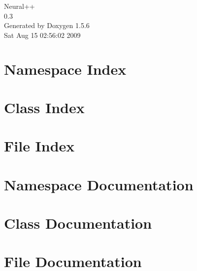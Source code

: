 \documentclass[a4paper]{book}
\begin{document}
\begin{titlepage}
\vspace*{7cm}
\begin{center}
{\Large Neural++ \\[1ex]\large 0.3 }\\
\vspace*{1cm}
{\large Generated by Doxygen 1.5.6}\\
\vspace*{0.5cm}
{\small Sat Aug 15 02:56:02 2009}\\
\end{center}
\end{titlepage}
\clearemptydoublepage
{}
\tableofcontents
\clearemptydoublepage
{}
\chapter{Namespace Index}

\chapter{Class Index}

\chapter{File Index}

\chapter{Namespace Documentation}

\chapter{Class Documentation}



















\chapter{File Documentation}



\printindex
\end{document}
